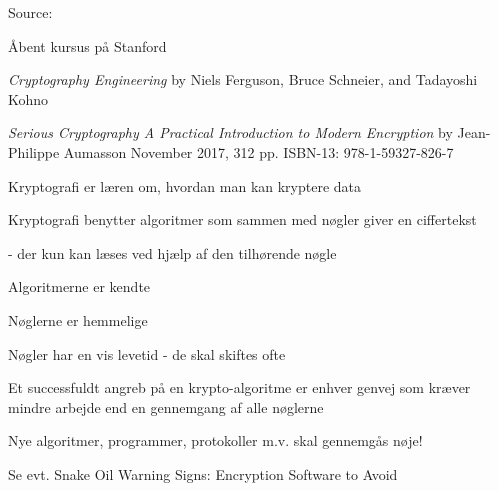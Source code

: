 \documentclass[Screen16to9,17pt]{foils}
\begin{document}
Source: 




Åbent kursus på Stanford\\



\emph{Cryptography Engineering} by
Niels Ferguson, Bruce Schneier, and Tadayoshi Kohno\\




\emph{Serious Cryptography
A Practical Introduction to Modern Encryption}
by Jean-Philippe Aumasson
November 2017, 312 pp.
ISBN-13:
978-1-59327-826-7





\begin{list1}
\item Kryptografi er læren om, hvordan man kan kryptere data
\item Kryptografi benytter algoritmer som sammen med nøgler giver en
  ciffertekst
\item  - der kun kan læses ved hjælp af den tilhørende nøgle
\end{list1}



\begin{list1}
\item Algoritmerne er kendte
\item Nøglerne er hemmelige
\item Nøgler har en vis levetid - de skal skiftes ofte
\item Et successfuldt angreb på en krypto-algoritme er enhver genvej
  som kræver mindre arbejde end en gennemgang af alle nøglerne
\item Nye algoritmer, programmer, protokoller m.v. skal gennemgås nøje!
\item Se evt. Snake Oil Warning Signs:
Encryption Software to Avoid\\
\end{list1}
\end{document}
